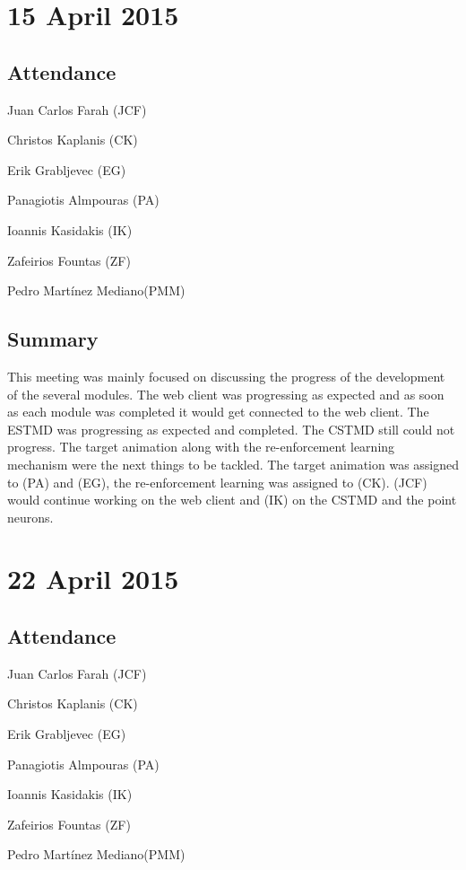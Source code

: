 \documentclass[a4paper,11pt]{article}
\begin{document}
\maketitle
\section*{15 April 2015}
\subsection*{Attendance}
\begin{compactenum}
\item Juan Carlos Farah (JCF)
\item Christos Kaplanis (CK)
\item Erik Grabljevec (EG)
\item Panagiotis Almpouras (PA)
\item Ioannis Kasidakis (IK)
\item Zafeirios Fountas (ZF)
\item Pedro Martínez Mediano(PMM)
\end{compactenum}

\subsection*{Summary}
This meeting was mainly focused on discussing the progress of the development of the several modules. The web client was progressing as expected and as soon as each module was completed it would get connected to the web client. The ESTMD was progressing as expected and completed. The CSTMD still could not progress. The target animation along with the re-enforcement learning mechanism were the next things to be tackled. The target animation was assigned to (PA) and (EG), the re-enforcement learning was assigned to (CK). (JCF) would continue working on the web client and (IK) on the CSTMD and the point neurons.

\maketitle
\section*{22 April 2015}
\subsection*{Attendance}
\begin{compactenum}
\item Juan Carlos Farah (JCF)
\item Christos Kaplanis (CK)
\item Erik Grabljevec (EG)
\item Panagiotis Almpouras (PA)
\item Ioannis Kasidakis (IK)
\item Zafeirios Fountas (ZF)
\item Pedro Martínez Mediano(PMM)
\end{compactenum}
\end{document}
